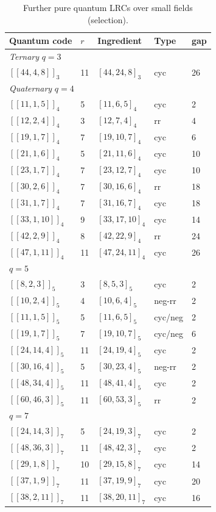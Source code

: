 \documentclass[journal,onecolumn]{IEEEtran}
\begin{document}
\begin{table}[!htbp]
\caption{Further pure quantum LRCs over small fields (selection).}
\label{tab:smallfields}
\centering
\renewcommand{\arraystretch}{1.15}
\begin{tabular}{lllll}
\toprule
Quantum code & $r$ & Ingredient & Type & gap \\
\midrule
\multicolumn{5}{l}{\textit{Ternary} $q=3$} \\
$[[44,4,8]]_3$   & 11 & $[44,24,8]_3$  & cyc & 26 \\
\multicolumn{5}{l}{\textit{Quaternary} $q=4$ } \\
$[[11,1,5]]_4$  & 5  & $[11,6,5]_4$  & cyc & 2 \\
$[[12,2,4]]_4$  & 3  & $[12,7,4]_4$  & rr  & 4 \\
$[[19,1,7]]_4$  & 7  & $[19,10,7]_4$ & cyc & 6 \\
$[[21,1,6]]_4$  & 5  & $[21,11,6]_4$ & cyc & 10 \\
$[[23,1,7]]_4$  & 7  & $[23,12,7]_4$ & cyc & 10 \\
$[[30,2,6]]_4$  & 7  & $[30,16,6]_4$ & rr  & 18 \\
$[[31,1,7]]_4$  & 7  & $[31,16,7]_4$ & cyc & 18 \\
$[[33,1,10]]_4$ & 9  & $[33,17,10]_4$& cyc & 14 \\
$[[42,2,9]]_4$  & 8  & $[42,22,9]_4$ & rr  & 24 \\
$[[47,1,11]]_4$ & 11 & $[47,24,11]_4$& cyc & 26 \\
\multicolumn{5}{l}{\textit{$q=5$}} \\
$[[8,2,3]]_5$    & 3  & $[8,5,3]_5$    & cyc & 2 \\
$[[10,2,4]]_5$   & 4  & $[10,6,4]_5$   & neg-rr & 2 \\
$[[11,1,5]]_5$   & 5  & $[11,6,5]_5$   & cyc/neg & 2 \\
$[[19,1,7]]_5$   & 7  & $[19,10,7]_5$  & cyc/neg & 6 \\
$[[24,14,4]]_5$  & 11 & $[24,19,4]_5$  & cyc & 2 \\
$[[30,16,4]]_5$  & 5  & $[30,23,4]_5$  & neg-rr & 2 \\
$[[48,34,4]]_5$  & 11 & $[48,41,4]_5$  & cyc & 2 \\
$[[60,46,3]]_5$  & 11 & $[60,53,3]_5$  & rr  & 2 \\
\multicolumn{5}{l}{\textit{$q=7$}} \\
$[[24,14,3]]_7$  & 5  & $[24,19,3]_7$  & cyc & 2 \\
$[[48,36,3]]_7$  & 11 & $[48,42,3]_7$  & cyc & 2 \\
$[[29,1,8]]_7$   & 10 & $[29,15,8]_7$  & cyc & 14 \\
$[[37,1,9]]_7$   & 11 & $[37,19,9]_7$  & cyc & 20 \\
$[[38,2,11]]_7$  & 11 & $[38,20,11]_7$ & cyc & 16 \\
\bottomrule
\end{tabular}
\end{table}
\end{document}

